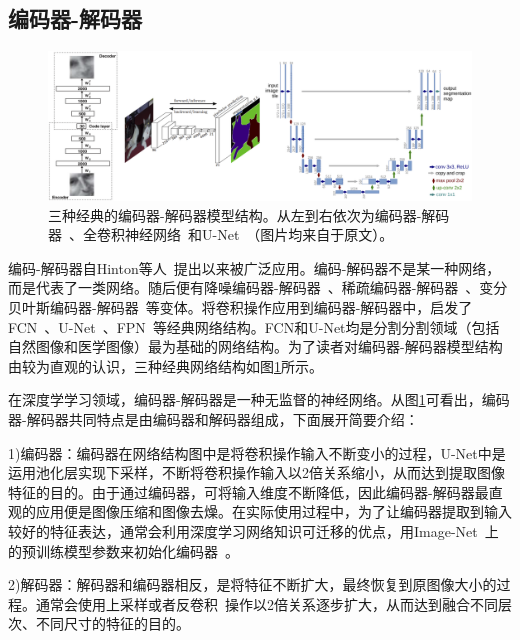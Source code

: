 \subsection{编码器-解码器}
\begin{figure}[h]
	\centering
	\includegraphics[width=1.0\textwidth]{figure/popular_encoder_decoder}
	\caption{三种经典的编码器-解码器模型结构。从左到右依次为编码器-解码器~\cite{hinton2006reducing}、全卷积神经网络~\cite{long2015fully}和U-Net~\cite{ronneberger2015u}（图片均来自于原文）。} 
	\label{fig:popular_encoder_decoder}
\end{figure}
编码-解码器自Hinton等人~\cite{hinton2006reducing}提出以来被广泛应用。编码-解码器不是某一种网络，而是代表了一类网络。随后便有降噪编码器-解码器~\cite{vincent2008extracting}、稀疏编码器-解码器~\cite{coates2011analysis}、变分贝叶斯编码器-解码器~\cite{kingma2013auto}等变体。将卷积操作应用到编码器-解码器中，启发了FCN~\cite{long2015fully}、U-Net~\cite{ronneberger2015u}、FPN~\cite{lin2017feature}等经典网络结构。FCN和U-Net均是分割分割领域（包括自然图像和医学图像）最为基础的网络结构。为了读者对编码器-解码器模型结构由较为直观的认识，三种经典网络结构如图\ref{fig:popular_encoder_decoder}所示。

在深度学学习领域，编码器-解码器是一种无监督的神经网络。从图\ref{fig:popular_encoder_decoder}可看出，编码器-解码器共同特点是由编码器和解码器组成，下面展开简要介绍：

1)编码器：编码器在网络结构图中是将卷积操作输入不断变小的过程，U-Net中是运用池化层实现下采样，不断将卷积操作输入以2倍关系缩小，从而达到提取图像特征的目的。由于通过编码器，可将输入维度不断降低，因此编码器-解码器最直观的应用便是图像压缩和图像去燥。在实际使用过程中，为了让编码器提取到输入较好的特征表达，通常会利用深度学习网络知识可迁移的优点，用Image-Net~\cite{deng2009imagenet}上的预训练模型参数来初始化编码器~\cite{iglovikov2018ternausnet}。

2)解码器：解码器和编码器相反，是将特征不断扩大，最终恢复到原图像大小的过程。通常会使用上采样或者反卷积~\cite{zeiler2010deconvolutional}操作以2倍关系逐步扩大，从而达到融合不同层次、不同尺寸的特征的目的。

